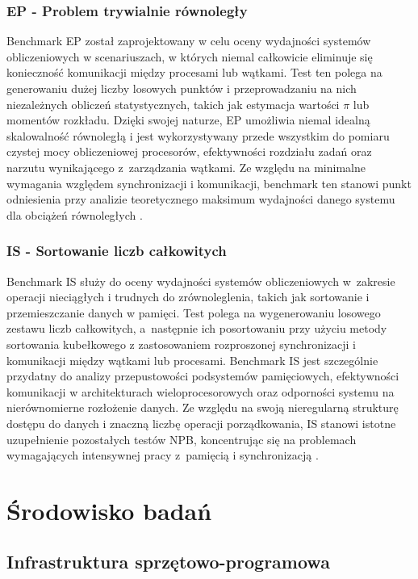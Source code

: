 \subsubsection{EP - Problem trywialnie równoległy}
Benchmark EP  został zaprojektowany w celu oceny wydajności systemów obliczeniowych w scenariuszach, w których niemal całkowicie eliminuje się konieczność komunikacji między procesami lub wątkami. Test ten polega na generowaniu dużej liczby losowych punktów i przeprowadzaniu na nich niezależnych obliczeń statystycznych, takich jak estymacja wartości $\pi$ lub momentów rozkładu. Dzięki swojej naturze, EP umożliwia niemal idealną skalowalność równoległą i jest wykorzystywany przede wszystkim do pomiaru czystej mocy obliczeniowej procesorów, efektywności rozdziału zadań oraz narzutu wynikającego z~zarządzania wątkami. Ze względu na minimalne wymagania względem synchronizacji i komunikacji, benchmark ten stanowi punkt odniesienia przy analizie teoretycznego maksimum wydajności danego systemu dla obciążeń równoległych \cite{nasaParallelBenchmarks}.

\subsubsection{IS - Sortowanie liczb całkowitych}
Benchmark IS  służy do oceny wydajności systemów obliczeniowych w~zakresie operacji nieciągłych i trudnych do zrównoleglenia, takich jak sortowanie i przemieszczanie danych w pamięci. Test polega na wygenerowaniu losowego zestawu liczb całkowitych, a~następnie ich posortowaniu przy użyciu metody sortowania kubełkowego  z zastosowaniem rozproszonej synchronizacji i komunikacji między wątkami lub procesami. Benchmark IS jest szczególnie przydatny do analizy przepustowości podsystemów pamięciowych, efektywności komunikacji w architekturach wieloprocesorowych oraz odporności systemu na nierównomierne rozłożenie danych. Ze względu na swoją nieregularną strukturę dostępu do danych i znaczną liczbę operacji porządkowania, IS stanowi istotne uzupełnienie pozostałych testów NPB, koncentrując się na problemach wymagających intensywnej pracy z~pamięcią i synchronizacją \cite{nasaParallelBenchmarks}.

\section{Środowisko badań}

\subsection{Infrastruktura sprzętowo-programowa}

